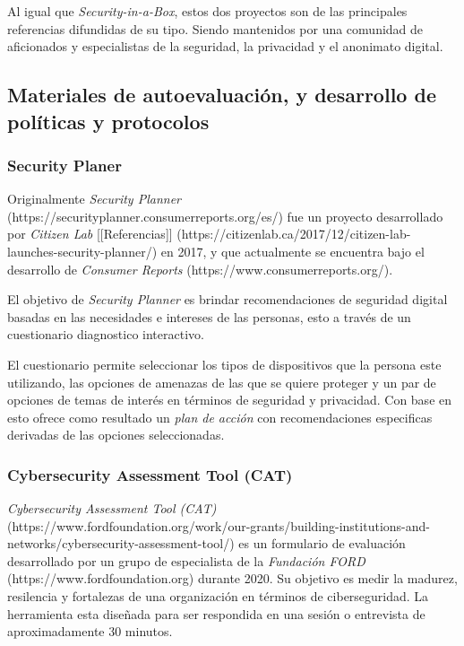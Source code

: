 \documentclass[12pt]{caltech_thesis}
\begin{document}
Al igual que \textit{Security-in-a-Box}, estos dos proyectos son de las principales referencias difundidas de su tipo. Siendo mantenidos por una comunidad de aficionados y especialistas de la seguridad, la privacidad y el anonimato digital.

\subsection{Materiales de autoevaluación, y desarrollo de políticas y protocolos}

\subsubsection{Security Planer}

Originalmente \textit{Security Planner} (https://securityplanner.consumerreports.org/es/) fue un proyecto desarrollado por \textit{Citizen Lab} [[Referencias]] (https://citizenlab.ca/2017/12/citizen-lab-launches-security-planner/) en 2017, y que actualmente se encuentra bajo el desarrollo de \textit{Consumer Reports} (https://www.consumerreports.org/).

El objetivo de \textit{Security Planner} es brindar recomendaciones de seguridad digital basadas en las necesidades e intereses de las personas, esto a través de un cuestionario diagnostico interactivo.

El cuestionario permite seleccionar los tipos de dispositivos que la persona este utilizando, las opciones de amenazas de las que se quiere proteger y un par de opciones de temas de interés en términos de seguridad y privacidad. Con base en esto ofrece como resultado un \textit{plan de acción} con recomendaciones especificas derivadas de las opciones seleccionadas.

\subsubsection{Cybersecurity Assessment Tool (CAT)}

\textit{Cybersecurity Assessment Tool (CAT)} (https://www.fordfoundation.org/work/our-grants/building-institutions-and-networks/cybersecurity-assessment-tool/) es un formulario de evaluación desarrollado por un grupo de especialista de la \textit{Fundación FORD} (https://www.fordfoundation.org) durante 2020. Su objetivo es medir la madurez, resilencia y fortalezas de una organización en términos de ciberseguridad. La herramienta esta diseñada para ser respondida en una sesión o entrevista de aproximadamente 30 minutos.
\end{document}
